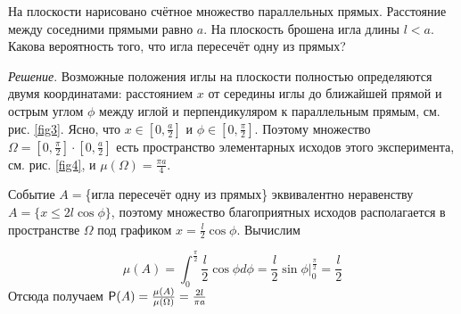 \begin{example}
	\label{ex:4.21}
На плоскости нарисовано счётное множество параллельных прямых. Расстояние между соседними прямыми равно $a$. На плоскость брошена игла длины $l < a$. Какова вероятность
того, что игла пересечёт одну из прямых?

\textit{Решение}. Возможные положения иглы на плоскости полностью определяются двумя координатами: расстоянием $x$ от середины иглы до ближайшей прямой и острым углом $\phi$ между иглой и перпендикуляром к параллельным прямым, см. рис. \ref{fig3}. Ясно, что $x \in [0, \frac{a}{2} ]$ и $\phi \in [0, \frac{\pi}{2} ]$. Поэтому множество $\Omega = [0, \frac{\pi}{2}] \cdot [0, \frac{a}{2} ]$ есть пространство элементарных исходов этого эксперимента, см. рис. \ref{fig4}, и $\mu(\Omega) = \frac{\pi a}{4}$.

Событие $A =$\{игла пересечёт одну из прямых\} эквивалентно неравенству
$A = \{x \leq 2{{l}} \cos \phi \}$, поэтому множество благоприятных исходов располагается в пространстве $\Omega$ под графиком $x = \frac{ {{l}}}{2} \cos \phi$. Вычислим

$$\mu(A)=\int_{0}^{\frac{\pi}{2}} \frac{{{l}}}{2} \cos \phi d\phi = \frac{{{l}}}{2} \sin \phi \bigg|_0^{\frac{\pi}{2}} = \frac{{{l}}}{2}$$
Отсюда получаем $\P(A) = \frac{\mu(A)}{\mu(\Omega)}
 = \frac{2{{l}}}{\pi a}$
\end{example}
